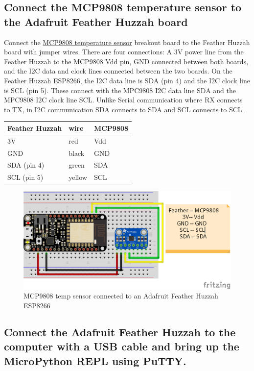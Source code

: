 \documentclass{book}
\makeatletter
\def\maxwidth{\ifdim\Gin@nat@width>\linewidth\linewidth
    \else\Gin@nat@width\fi}
\let\Oldincludegraphics\includegraphics
\renewcommand{\includegraphics}[1]{\Oldincludegraphics[width=.8\maxwidth]{#1}}
\makeatother
\begin{document}
    
        \subsection{Connect the MCP9808 temperature sensor to the Adafruit
Feather Huzzah
board}\label{connect-the-mcp9808-temperature-sensor-to-the-adafruit-feather-huzzah-board}
    




    
        Connect the \href{https://www.adafruit.com/product/1782}{MCP9808
temperature sensor} breakout board to the Feather Huzzah board with
jumper wires. There are four connections: A 3V power line from the
Feather Huzzah to the MCP9808 Vdd pin, GND connected between both
boards, and the I2C data and clock lines connected between the two
boards. On the Feather Huzzah ESP8266, the I2C data line is SDA (pin 4)
and the I2C clock line is SCL (pin 5). These connect with the MPC9808
I2C data line SDA and the MPC9808 I2C clock line SCL. Unlike Serial
communication where RX connects to TX, in I2C communication SDA connects
to SDA and SCL connects to SCL.

\begin{longtable}[]{@{}lll@{}}
\toprule
Feather Huzzah & wire & MCP9808\tabularnewline
\midrule
\endhead
3V & red & Vdd\tabularnewline
GND & black & GND\tabularnewline
SDA (pin 4) & green & SDA\tabularnewline
SCL (pin 5) & yellow & SCL\tabularnewline
\bottomrule
\end{longtable}

\begin{figure}
\centering
\includegraphics{images/feather_huzzah_temp_sensor_fritzing.png}
\caption{MCP9808 temp sensor connected to an Adafruit Feather Huzzah
ESP8266}
\end{figure}
    




    
        \subsection{Connect the Adafruit Feather Huzzah to the computer with a
USB cable and bring up the MicroPython REPL using
PuTTY.}\label{connect-the-adafruit-feather-huzzah-to-the-computer-with-a-usb-cable-and-bring-up-the-micropython-repl-using-putty.}
    
\end{document}
